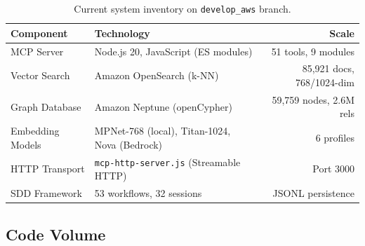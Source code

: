 \documentclass[11pt,letterpaper]{article}
\begin{document}
\begin{table}[H]
\centering
\footnotesize
\begin{tabular}{@{}llr@{}}
\toprule
\textbf{Component} & \textbf{Technology} & \textbf{Scale} \\
\midrule
MCP Server & Node.js 20, JavaScript (ES modules) & 51 tools, 9 modules \\
Vector Search & Amazon OpenSearch (k-NN) & 85,921 docs, 768/1024-dim \\
Graph Database & Amazon Neptune (openCypher) & 59,759 nodes, 2.6M rels \\
Embedding Models & MPNet-768 (local), Titan-1024, Nova (Bedrock) & 6 profiles \\
HTTP Transport & \texttt{mcp-http-server.js} (Streamable HTTP) & Port 3000 \\
SDD Framework & 53 workflows, 32 sessions & JSONL persistence \\
\bottomrule
\end{tabular}
\caption{Current system inventory on \texttt{develop\_aws} branch.}
\end{table}

\subsection{Code Volume}
\end{document}
